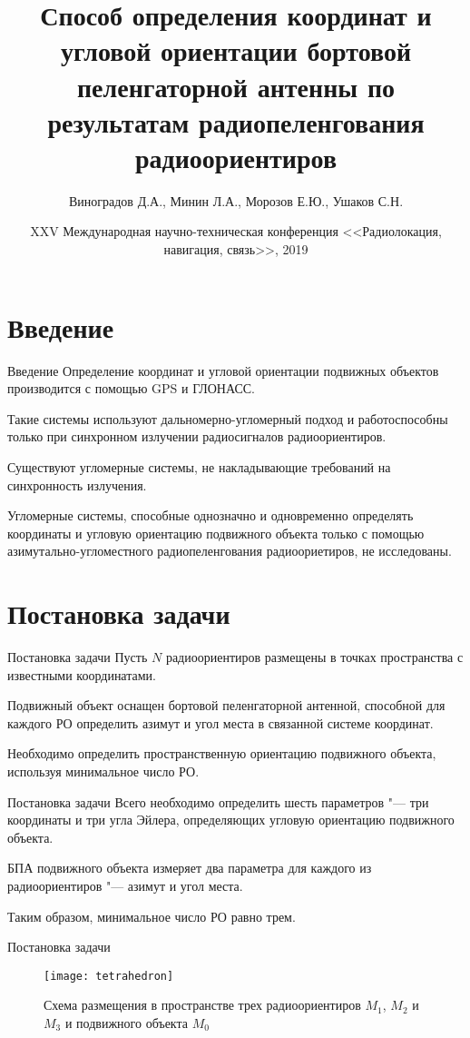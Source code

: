\documentclass[russian,hyperref={unicode}]{beamer}
\title{Способ определения координат и угловой ориентации бортовой пеленгаторной антенны по результатам радиопеленгования радиоориентиров}
\institute
{
  \inst{1}%
  Военно-воздушная академия имени профессора Н.Е.Жуковского и Ю.А.Гагарина\\
  \inst{2}%
	Воронежский Государственный Университет
}
\author
{
  Виноградов Д.А.\inst{1}, Минин Л.А.\inst{2}, Морозов Е.Ю.\inst{2}, Ушаков С.Н\inst{2}.
}
\date[RLNC 2019]{XXV Международная научно-техническая конференция <<Радиолокация, навигация, связь>>, 2019}
\begin{document}
  \frame{\titlepage}

  \section{Введение}
  \begin{frame}{Введение}
    Определение координат и угловой ориентации подвижных объектов производится с
    помощью GPS и ГЛОНАСС.

    Такие системы используют дальномерно-угломерный подход и работоспособны только
    при синхронном излучении радиосигналов радиоориентиров.

    Существуют угломерные системы, не накладывающие требований на синхронность излучения.

    Угломерные системы, способные однозначно и одновременно определять координаты и
    угловую ориентацию подвижного объекта только с помощью азимутально-угломестного
    радиопеленгования радиоориетиров, не исследованы.
  \end{frame}

  \section{Постановка задачи}
  \begin{frame}{Постановка задачи}
      Пусть $N$ радиоориентиров размещены в точках пространства с известными координатами.

      Подвижный объект оснащен бортовой пеленгаторной антенной, способной для каждого
      РО определить азимут и угол места в связанной системе координат.

      Необходимо определить пространственную ориентацию подвижного объекта,
      используя минимальное число РО.
  \end{frame}

  \begin{frame}{Постановка задачи}
    Всего необходимо определить шесть параметров "--- три координаты и три угла Эйлера,
    определяющих угловую ориентацию подвижного объекта.

    БПА подвижного объекта измеряет два параметра для каждого из радиоориентиров "---
    азимут и угол места.

    Таким образом, минимальное число РО равно трем.
  \end{frame}

  \begin{frame}{Постановка задачи}
    \begin{figure}
      \begin{center}
        \texttt{[image: tetrahedron]}

        \caption{Схема размещения в пространстве трех радиоориентиров $M_1$, $M_2$ и $M_3$ и подвижного объекта $M_0$}
      \end{center}
    \end{figure}
  \end{frame}
\end{document}
